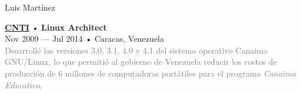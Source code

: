 \documentclass[12pt]{article}
\begin{document}
\begin{cv}{Luis Mart\'inez}
\begin{minipage}[t]{0.55\textwidth}
    \parbox[t]{\linewidth}{
      \textbf{\href{https://www.cnti.gob.ve}{CNTI}} • \textrm{\textbf{Linux Architect}}\\
      Nov 2009 --- Jul 2014 • Caracas, Venezuela\\
      \footnotesize{\textcolor{gray}{Desarrollé las versiones 3.0, 3.1, 4.0 y 4.1 del sistema operativo Canaima GNU/Linux, lo que permitió al gobierno de Venezuela reducir los costos de producción de 6 millones de computadoras portátiles para el programa \textsl{Canaima Educativo}.}}\\
    }
  \end{minipage}

\end{cv}
\end{document}
